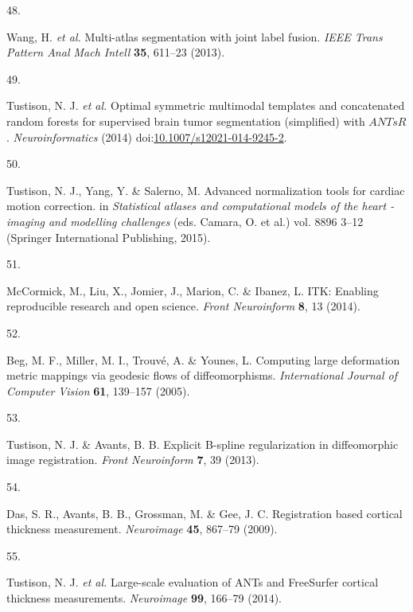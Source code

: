 \documentclass[
  12pt,
]{article}
\newlength{\cslhangindent}
\newlength{\csllabelwidth}
\newenvironment{CSLReferences}[2] %
 {%
  \setlength{\parindent}{0pt}
  \ifodd #1 \everypar{\setlength{\hangindent}{\cslhangindent}}\ignorespaces\fi
  \ifnum #2 > 0
  \setlength{\parskip}{#2\baselineskip}
  \fi
 }%
 {}
\newcommand{\CSLLeftMargin}[1]{\parbox[t]{\csllabelwidth}{#1}}
\newcommand{\CSLRightInline}[1]{\parbox[t]{\linewidth - \csllabelwidth}{#1}\break}
\begin{document}
\begin{CSLReferences}{0}{0}
\leavevmode{}%
\CSLLeftMargin{48. }
\CSLRightInline{Wang, H. \emph{et al.} Multi-atlas segmentation with
joint label fusion. \emph{IEEE Trans Pattern Anal Mach Intell}
\textbf{35}, 611--23 (2013).}

\leavevmode{}%
\CSLLeftMargin{49. }
\CSLRightInline{Tustison, N. J. \emph{et al.} Optimal symmetric
multimodal templates and concatenated random forests for supervised
brain tumor segmentation (simplified) with {\(ANTsR\)}.
\emph{Neuroinformatics} (2014)
doi:\href{https://doi.org/10.1007/s12021-014-9245-2}{10.1007/s12021-014-9245-2}.}

\leavevmode{}%
\CSLLeftMargin{50. }
\CSLRightInline{Tustison, N. J., Yang, Y. \& Salerno, M. Advanced
normalization tools for cardiac motion correction. in \emph{Statistical
atlases and computational models of the heart - imaging and modelling
challenges} (eds. Camara, O. et al.) vol. 8896 3--12 (Springer
International Publishing, 2015).}

\leavevmode{}%
\CSLLeftMargin{51. }
\CSLRightInline{McCormick, M., Liu, X., Jomier, J., Marion, C. \&
Ibanez, L. ITK: Enabling reproducible research and open science.
\emph{Front Neuroinform} \textbf{8}, 13 (2014).}

\leavevmode{}%
\CSLLeftMargin{52. }
\CSLRightInline{Beg, M. F., Miller, M. I., Trouvé, A. \& Younes, L.
Computing large deformation metric mappings via geodesic flows of
diffeomorphisms. \emph{International Journal of Computer Vision}
\textbf{61}, 139--157 (2005).}

\leavevmode{}%
\CSLLeftMargin{53. }
\CSLRightInline{Tustison, N. J. \& Avants, B. B. Explicit {B}-spline
regularization in diffeomorphic image registration. \emph{Front
Neuroinform} \textbf{7}, 39 (2013).}

\leavevmode{}%
\CSLLeftMargin{54. }
\CSLRightInline{Das, S. R., Avants, B. B., Grossman, M. \& Gee, J. C.
Registration based cortical thickness measurement. \emph{Neuroimage}
\textbf{45}, 867--79 (2009).}

\leavevmode{}%
\CSLLeftMargin{55. }
\CSLRightInline{Tustison, N. J. \emph{et al.} Large-scale evaluation of
{ANTs} and {FreeSurfer} cortical thickness measurements.
\emph{Neuroimage} \textbf{99}, 166--79 (2014).}


\end{CSLReferences}
\end{document}

